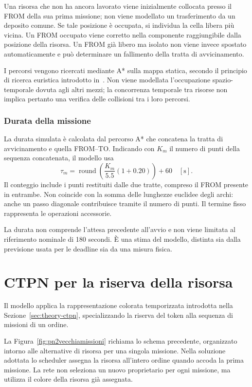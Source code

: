 Una risorsa che non ha ancora lavorato viene inizialmente collocata presso
il FROM della sua prima missione; non viene modellato un trasferimento da un
deposito comune. Se tale posizione è occupata, si individua la cella libera
più vicina. Un FROM occupato viene corretto nella componente raggiungibile
dalla posizione della risorsa. Un FROM già libero ma isolato non viene invece
spostato automaticamente e può determinare un fallimento della tratta di
avvicinamento.

I percorsi vengono ricercati mediante A* sulla mappa statica, secondo il
principio di ricerca euristica introdotto in~\cite{hart1968formal}. Non viene
modellata l'occupazione spazio-temporale dovuta agli altri mezzi; la
concorrenza temporale tra risorse non implica pertanto una verifica delle
collisioni tra i loro percorsi.

\subsubsection{Durata della missione}

La durata simulata è calcolata dal percorso A* che concatena la tratta di
avvicinamento e quella FROM--TO. Indicando con $K_m$ il numero di punti
della sequenza concatenata, il modello usa
\begin{equation}
    \tau_m=\operatorname{round}\!\left(\frac{K_m}{5.5}(1+0.20)\right)+60
    \quad [\mathrm{s}].
\end{equation}
Il conteggio include i punti restituiti dalle due tratte, compreso il FROM
presente in entrambe. Non coincide con la somma delle lunghezze euclidee
degli archi: anche un passo diagonale contribuisce tramite il numero di
punti. Il termine fisso rappresenta le operazioni accessorie.

La durata non comprende l'attesa precedente all'avvio e non viene limitata
al riferimento nominale di 180 secondi. È una stima del modello, distinta
sia dalla previsione usata per le deadline sia da una misura fisica.

\section{CTPN per la riserva della risorsa}
\label{sec:progetto-ctpn}

Il modello applica la rappresentazione colorata temporizzata introdotta
nella Sezione~\ref{sec:theory-ctpn}, specializzando la riserva del token
alla sequenza di missioni di un ordine.

La Figura~\ref{fig:pn2vecchiamissioni} richiama lo schema precedente,
organizzato intorno alle alternative di risorsa per una singola missione.
Nella soluzione adottata lo scheduler assegna la risorsa all'intero ordine
quando accoda la prima missione. La rete
non seleziona un nuovo proprietario
per ogni missione, ma utilizza il colore della risorsa già assegnata.

